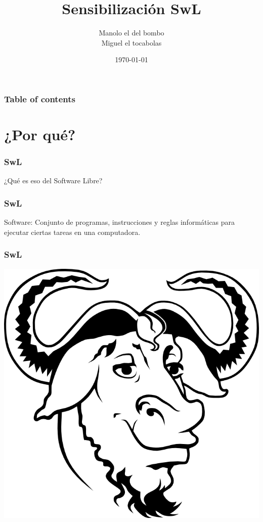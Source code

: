 \documentclass{beamer}
\title{Sensibilización SwL}
\author{Manolo el del bombo\\Miguel el tocabolas}
\date{\today}
\begin{document}
\begin{frame}
    \titlepage
\end{frame}

\begin{frame} \frametitle{Table of contents}
    \tableofcontents
\end{frame}


\section{¿Por qué?}

\begin{frame}\frametitle{SwL}
    ¿Qué es eso del Software Libre?
\end{frame}


\begin{frame}\frametitle{SwL}

    Software: \pause Conjunto de programas,
    instrucciones y reglas informáticas para
    ejecutar ciertas tareas en una computadora.

\end{frame}

\begin{frame}\frametitle{SwL}

    \includegraphics[scale=0.1]{figures/The_GNU_logo.png}
    
\end{frame}
\end{document}
